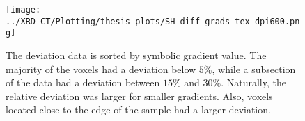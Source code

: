\begin{figure}[h!]
    \centering
    \texttt{[image: ../XRD\_CT/Plotting/thesis\_plots/SH\_diff\_grads\_tex\_dpi600.png]}
    \caption[Initial Gradient Deviation]{The deviation data is sorted by symbolic gradient value.
        The majority of the voxels had a deviation below $5\%$, while a subsection of the data had a deviation between $15\%$ and $30\%$.
        Naturally, the relative deviation was larger for smaller gradients.
        Also, voxels located close to the edge of the sample had a larger deviation.}
    \label{fig:gradient_comparison}
\end{figure} %



